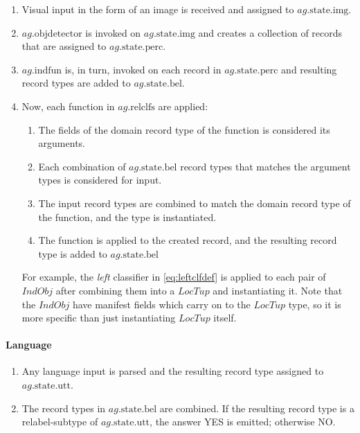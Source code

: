 \begin{enumerate}
\item Visual input in the form of an image is received and assigned to $ag.\text{state}.\text{img}$.
\item $ag.\text{objdetector}$ is invoked on $ag.\text{state.img}$ and creates a collection of records that are assigned to $ag.\text{state}.\text{perc}$.
\item $ag.\text{indfun}$ is, in turn, invoked on each record in $ag.\text{state.perc}$ and resulting record types are added to $ag.\text{state.bel}$.
\item Now, each function in $ag.\text{relclfs}$ are applied:
	\begin{enumerate}
	\item The fields of the domain record type of the function is considered its arguments.
	\item Each combination of $ag.\text{state.bel}$ record types that matches the argument types is considered for input.
	\item The input record types are combined to match the domain record type of the function, and the type is instantiated.
	\item The function is applied to the created record, and the resulting record type is added to $ag.\text{state.bel}$
	\end{enumerate}
	For example, the \textit{left} classifier in \autoref{eq:leftclfdef} is applied to each pair of $IndObj$ after combining them into a $LocTup$ and instantiating it.
    Note that the $IndObj$ have manifest fields which carry on to the $LocTup$ type, so it is more specific than just instantiating $LocTup$ itself.
\end{enumerate}



\paragraph{Language}

\begin{enumerate}
\item Any language input is parsed and the resulting record type assigned to $ag.\text{state.utt}$.
\item The record types in $ag.\text{state.bel}$ are combined. If the resulting record type is a relabel-subtype of $ag.\text{state.utt}$, the answer YES is emitted; otherwise NO.
\end{enumerate}



